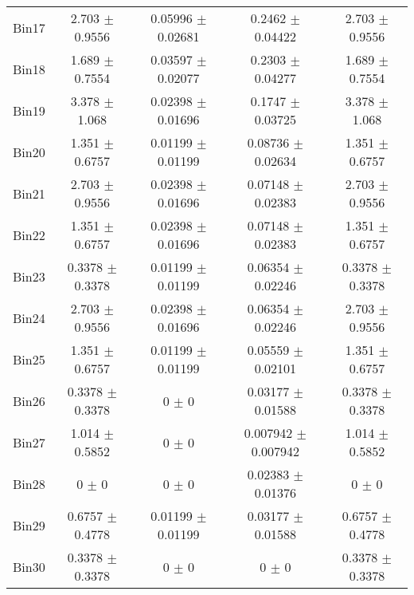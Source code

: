 \begin{tabular}{@{\extracolsep{4pt}}lcccc@{}}
     Bin17 & 2.703 $\pm$ 0.9556 & 0.05996 $\pm$ 0.02681 & 0.2462 $\pm$ 0.04422 & 2.703 $\pm$ 0.9556 \\ 
     Bin18 & 1.689 $\pm$ 0.7554 & 0.03597 $\pm$ 0.02077 & 0.2303 $\pm$ 0.04277 & 1.689 $\pm$ 0.7554 \\ 
     Bin19 & 3.378 $\pm$ 1.068 & 0.02398 $\pm$ 0.01696 & 0.1747 $\pm$ 0.03725 & 3.378 $\pm$ 1.068 \\ 
     Bin20 & 1.351 $\pm$ 0.6757 & 0.01199 $\pm$ 0.01199 & 0.08736 $\pm$ 0.02634 & 1.351 $\pm$ 0.6757 \\ 
     Bin21 & 2.703 $\pm$ 0.9556 & 0.02398 $\pm$ 0.01696 & 0.07148 $\pm$ 0.02383 & 2.703 $\pm$ 0.9556 \\ 
     Bin22 & 1.351 $\pm$ 0.6757 & 0.02398 $\pm$ 0.01696 & 0.07148 $\pm$ 0.02383 & 1.351 $\pm$ 0.6757 \\ 
     Bin23 & 0.3378 $\pm$ 0.3378 & 0.01199 $\pm$ 0.01199 & 0.06354 $\pm$ 0.02246 & 0.3378 $\pm$ 0.3378 \\ 
     Bin24 & 2.703 $\pm$ 0.9556 & 0.02398 $\pm$ 0.01696 & 0.06354 $\pm$ 0.02246 & 2.703 $\pm$ 0.9556 \\ 
     Bin25 & 1.351 $\pm$ 0.6757 & 0.01199 $\pm$ 0.01199 & 0.05559 $\pm$ 0.02101 & 1.351 $\pm$ 0.6757 \\ 
     Bin26 & 0.3378 $\pm$ 0.3378 & 0 $\pm$ 0 & 0.03177 $\pm$ 0.01588 & 0.3378 $\pm$ 0.3378 \\ 
     Bin27 & 1.014 $\pm$ 0.5852 & 0 $\pm$ 0 & 0.007942 $\pm$ 0.007942 & 1.014 $\pm$ 0.5852 \\ 
     Bin28 & 0 $\pm$ 0 & 0 $\pm$ 0 & 0.02383 $\pm$ 0.01376 & 0 $\pm$ 0 \\ 
     Bin29 & 0.6757 $\pm$ 0.4778 & 0.01199 $\pm$ 0.01199 & 0.03177 $\pm$ 0.01588 & 0.6757 $\pm$ 0.4778 \\ 
     Bin30 & 0.3378 $\pm$ 0.3378 & 0 $\pm$ 0 & 0 $\pm$ 0 & 0.3378 $\pm$ 0.3378 \\ 
\hline\hline
  \end{tabular}

